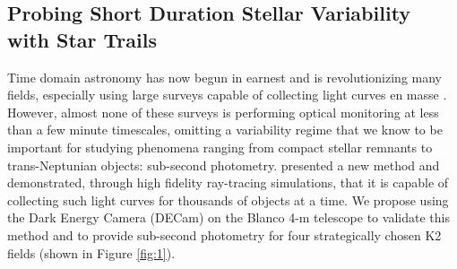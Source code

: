 \documentclass[11pt]{article}
\begin{document}

\subsection*{Probing Short Duration Stellar Variability with Star Trails}


Time domain astronomy has now begun in earnest and is revolutionizing many fields, especially using large surveys capable of collecting light curves en masse \citep{2012IAUS..285..141D}. However, almost none of these surveys is performing optical monitoring at less than a few minute timescales, omitting a variability regime that we know to be important for studying phenomena ranging from compact stellar remnants to trans-Neptunian objects: sub-second photometry. \citealt{2018arXiv180806977T} presented a new method and demonstrated, through high fidelity ray-tracing simulations, that it is capable of collecting such light curves for thousands of objects at a time. We propose using the Dark Energy Camera (DECam) on the Blanco 4-m telescope to validate this method and to provide sub-second photometry for four strategically chosen K2 fields (shown in Figure \ref{fig:1}).


\end{document}
